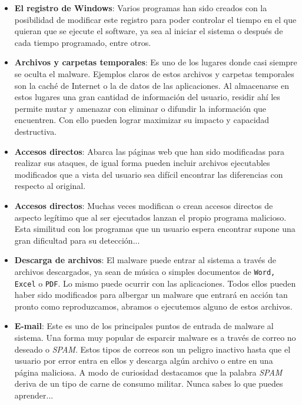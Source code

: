 \documentclass[12pt]{article}
\begin{document}
            \begin{itemize}
                \item \textbf{El registro de Windows}: Varios programas han sido creados con la posibilidad de modificar este registro para poder controlar el tiempo en el que quieran que se ejecute el software, ya sea al iniciar el sistema o después de cada tiempo programado, entre otros.
                \item \textbf{Archivos y carpetas temporales}: Es uno de los lugares donde casi siempre se oculta el malware. Ejemplos claros de estos archivos y carpetas temporales son la caché de Internet o la de datos de las aplicaciones. Al almacenarse en estos lugares una gran cantidad de información del usuario, residir ahí les permite mutar y amenazar con eliminar o difundir la información que encuentren. Con ello pueden lograr maximizar su impacto y capacidad destructiva.
                \item \textbf{Accesos directos}: Abarca las páginas web que han sido modificadas para realizar sus ataques, de igual forma pueden incluir archivos ejecutables modificados que a vista del usuario sea difícil encontrar las diferencias con respecto al original.
                \item \textbf{Accesos directos}: Muchas veces modifican o crean accesos directos de aspecto legítimo que al ser ejecutados lanzan el propio programa malicioso. Esta similitud con los programas que un usuario espera encontrar supone una gran dificultad para su detección...
                \item \textbf{Descarga de archivos}: El malware puede entrar al sistema a través de archivos descargados, ya sean de música o simples documentos de \texttt{Word, Excel} o \texttt{PDF}. Lo mismo puede ocurrir con las aplicaciones. Todos ellos pueden haber sido modificados para albergar un malware que entrará en acción tan pronto como reproduzcamos, abramos o ejecutemos alguno de estos archivos.
                \item \textbf{E-mail}: Este es uno de los principales puntos de entrada de malware al sistema. Una forma muy popular de esparcir malware es a través de correo no deseado o \textit{SPAM}. Estos tipos de correos son un peligro inactivo hasta que el usuario por error entra en ellos y descarga algún archivo o entre en una página maliciosa. A modo de curiosidad destacamos que la palabra \textit{SPAM} deriva de un tipo de carne de consumo militar. Nunca sabes lo que puedes aprender...
            \end{itemize}
\end{document}
